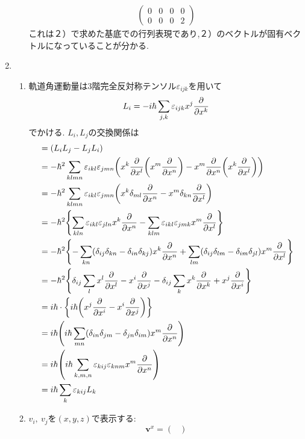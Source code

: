 \documentclass[uplatex,dvipdfmx, a4paper,11pt]{jsarticle}
\begin{document}
\begin{enumerate}[1.]
\begin{enumerate}[1）]
\begin{align*}
\begin{pmatrix}
                0&0&0&0\\
                0&0&0&2
            \end{pmatrix}
        \end{align*}
        これは２）で求めた基底での行列表現であり,２）のベクトルが固有ベクトルになっていることが分かる.
    \end{enumerate}
    \item \begin{enumerate}[1）]
        \item 軌道角運動量は3階完全反対称テンソル$\varepsilon_{ijk}$を用いて
        \begin{equation}
            L_i=-i\hbar\sum_{j,k}\varepsilon_{ijk}x^{j}\pdv{x^k}
        \end{equation}
        でかける. $L_i, L_j$の交換関係は
        \begin{align*}
            [L_i,L_j]&=(L_iL_j-L_jL_i)\\
            &=-\hbar^2\sum_{klmn}\varepsilon_{ikl}\varepsilon_{jmn}\qty(x^k\pdv{x^l}\qty(x^m\pdv{x^n})-x^m\pdv{x^n}\qty(x^k\pdv{x^l}))\\
            &=-\hbar^2\sum_{klmn}\varepsilon_{ikl}\varepsilon_{jmn}\qty(x^k\delta_{ml}\pdv{x^n}-x^m\delta_{kn}\pdv{x^l})\\
            &=-\hbar^2\qty{\sum_{kln}\varepsilon_{ikl}\varepsilon_{jln}x^k\pdv{x^n}-\sum_{klm}\varepsilon_{ikl}\varepsilon_{jmk}x^m\pdv{x^l}}\\
            &=-\hbar^2\qty{-\sum_{kn}(\delta_{ij}\delta_{kn}-\delta_{in}\delta_{kj})x^k\pdv{x^n}+\sum_{lm}(\delta_{ij}\delta_{lm}-\delta_{im}\delta_{jl})x^m\pdv{x^l}}\\
            &=-\hbar^2\qty{\delta_{ij}\sum_{l}x^l\pdv{x^l}-x^i\pdv{x^j}-\delta_{ij}\sum_{k}x^k\pdv{x^k}+x^j\pdv{x^i}}\\
            &=i\hbar\cdot\qty{i\hbar\qty(x^j\pdv{x^i}-x^i\pdv{x^j})}\\
            &=i\hbar\qty(i\hbar\sum_{mn}(\delta_{in}\delta_{jm}-\delta_{jn}\delta_{im})x^m\pdv{x^n})\\
            &=i\hbar\qty(i\hbar\sum_{k,m,n}\varepsilon_{kij}\varepsilon_{knm}x^m\pdv{x^n})\\
            &=i\hbar\sum_{k}\varepsilon_{kij}L_k
        \end{align*}
        \item 
        $v_i,\ v_j$を$(x,y,z)$で表示する:
        \begin{equation*}
            \bm{v}^x=
            \begin{pmatrix}

\end{pmatrix}
\end{equation*}
\end{enumerate}
\end{enumerate}
\end{document}
